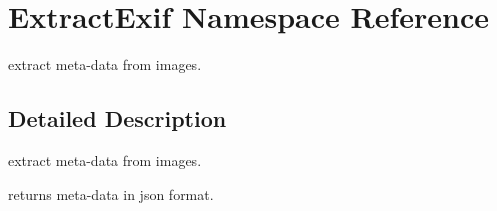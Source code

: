 \hypertarget{namespaceExtractExif}{}\section{Extract\+Exif Namespace Reference}
\label{namespaceExtractExif}


extract meta-\/data from images.  




\subsection{Detailed Description}
extract meta-\/data from images. 

returns meta-\/data in json format. 